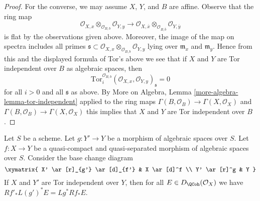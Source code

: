 \begin{proof}
\medskip\noindent
For the converse, we may assume $X$, $Y$, and $B$ are affine.
Observe that the ring map
$$
\mathcal{O}_{X, x} \otimes_{\mathcal{O}_{B, b}} \mathcal{O}_{Y, y}
\longrightarrow
\mathcal{O}_{X, \overline{x}} \otimes_{\mathcal{O}_{B, \overline{b}}}
\mathcal{O}_{Y, \overline y}
$$
is flat by the observations given above. Moreover, the image of the map
on spectra includes all primes
$\mathfrak s \subset
\mathcal{O}_{X, x} \otimes_{\mathcal{O}_{B, b}} \mathcal{O}_{Y, y}$
lying over $\mathfrak m_x$ and $\mathfrak m_y$.
Hence from this and the displayed formula of Tor's above we see that if
$X$ and $Y$ are Tor independent over $B$ as algebraic spaces, then
$$
\text{Tor}_i^{\mathcal{O}_{B, b}}
(\mathcal{O}_{X, x}, \mathcal{O}_{Y, y})_\mathfrak s = 0
$$
for all $i > 0$ and all $\mathfrak s$ as above. By
More on Algebra, Lemma \ref{more-algebra-lemma-tor-independent}
applied to the ring maps
$\Gamma(B, \mathcal{O}_B) \to \Gamma(X, \mathcal{O}_X)$
and
$\Gamma(B, \mathcal{O}_B) \to \Gamma(X, \mathcal{O}_X)$
this implies that $X$ and $Y$ are Tor independent over $B$.
\end{proof}

\begin{lemma}
\label{lemma-compare-base-change}
Let $S$ be a scheme. Let $g : Y' \to Y$ be a morphism of algebraic spaces over
$S$. Let $f : X \to Y$ be a quasi-compact and quasi-separated morphism of
algebraic spaces over $S$. Consider the base change diagram
$$
\xymatrix{
X' \ar[r]_{g'} \ar[d]_{f'} &
X \ar[d]^f \\
Y' \ar[r]^g &
Y
}
$$
If $X$ and $Y'$ are Tor independent over $Y$, then for all
$E \in D_\QCoh(\mathcal{O}_X)$ we have
$Rf'_*L(g')^*E = Lg^*Rf_*E$.
\end{lemma}

